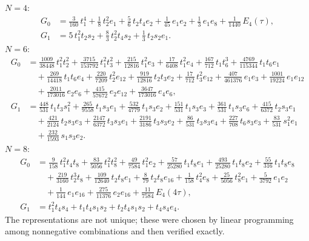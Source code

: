 \documentclass[11pt]{amsart}
\theoremstyle{definition}
\begin{document}
\noindent$N=4$:
\begin{align*}
G_0&=\tfrac{3}{160}\,t_{1}^{4} + \tfrac{1}{8}\,t_{2}^{2}e_{1} + \tfrac{5}{6}\,t_{2}t_{4}e_{2} + \tfrac{1}{45}\,e_{1}e_{2} + \tfrac{1}{3}\,e_{1}e_{8} + \tfrac{1}{1440}\,E_4(\tau),\\
G_1&=5\,t_{1}^{2}t_{2}s_{2} + \tfrac{8}{3}\,t_{2}^{2}t_{4}s_{2} + \tfrac{1}{3}\,t_{2}s_{2}e_{1}.
\end{align*}
$N=6$:
\begin{align*}
G_0&=\tfrac{1009}{38448}\,t_{1}^{2}t_{2}^{2} + \tfrac{3715}{153792}\,t_{1}^{2}t_{3}^{2} + \tfrac{215}{12816}\,t_{1}^{2}e_{3} + \tfrac{17}{6408}\,t_{1}^{2}e_{4} + \tfrac{167}{712}\,t_{1}t_{6}^{3} + \tfrac{4769}{115344}\,t_{1}t_{6}e_{1}\\
&\quad + \tfrac{269}{14418}\,t_{1}t_{6}e_{4} + \tfrac{220}{7209}\,t_{2}^{2}e_{12} + \tfrac{919}{12816}\,t_{2}t_{3}e_{2} + \tfrac{17}{712}\,t_{3}^{2}e_{12} + \tfrac{407}{461376}\,e_{1}e_{3} + \tfrac{1001}{19224}\,e_{1}e_{12}\\
&\quad + \tfrac{2011}{173016}\,e_{2}e_{6} + \tfrac{415}{57672}\,e_{2}e_{12} + \tfrac{3647}{173016}\,e_{4}e_{6},\\
G_1&=\tfrac{448}{531}\,t_{1}t_{3}s_{1}^{2} + \tfrac{265}{9558}\,t_{1}s_{3}e_{1} + \tfrac{532}{4779}\,t_{1}s_{3}e_{2} + \tfrac{151}{531}\,t_{1}s_{3}e_{3} + \tfrac{361}{531}\,t_{1}s_{3}e_{6} + \tfrac{415}{6372}\,t_{2}s_{3}e_{1}\\
&\quad + \tfrac{421}{2124}\,t_{2}s_{3}e_{3} + \tfrac{2147}{6372}\,t_{3}s_{3}e_{1} + \tfrac{2191}{3186}\,t_{3}s_{3}e_{2} + \tfrac{86}{531}\,t_{3}s_{3}e_{4} + \tfrac{227}{708}\,t_{6}s_{3}e_{3} + \tfrac{83}{531}\,s_{1}^{2}e_{1}\\
&\quad + \tfrac{232}{1593}\,s_{1}s_{3}e_{2}.
\end{align*}
$N=8$:
\begin{align*}
G_0&=\tfrac{9}{158}\,t_{1}^{2}t_{4}t_{8} + \tfrac{83}{5056}\,t_{1}^{2}t_{8}^{2} + \tfrac{49}{7584}\,t_{1}^{2}e_{2} + \tfrac{57}{25280}\,t_{1}t_{8}e_{1} + \tfrac{493}{25280}\,t_{1}t_{8}e_{2} + \tfrac{55}{316}\,t_{1}t_{8}e_{8}\\
&\quad + \tfrac{219}{3160}\,t_{2}^{3}t_{8} + \tfrac{109}{12640}\,t_{2}t_{8}e_{1} + \tfrac{8}{79}\,t_{2}t_{8}e_{16} + \tfrac{1}{158}\,t_{4}^{2}e_{8} + \tfrac{25}{5056}\,t_{8}^{2}e_{1} + \tfrac{5}{3792}\,e_{1}e_{2}\\
&\quad + \tfrac{1}{144}\,e_{1}e_{16} + \tfrac{275}{11376}\,e_{2}e_{16} + \tfrac{11}{7584}\,E_4(4\tau),\\
G_1&=t_{1}^{2}t_{4}s_{4} + t_{1}t_{4}s_{1}s_{2} + t_{2}t_{4}s_{1}s_{2} + t_{4}s_{4}e_{4}.
\end{align*}
The representations are not unique; these were chosen by linear programming among nonnegative combinations and then verified exactly.
\end{document}
